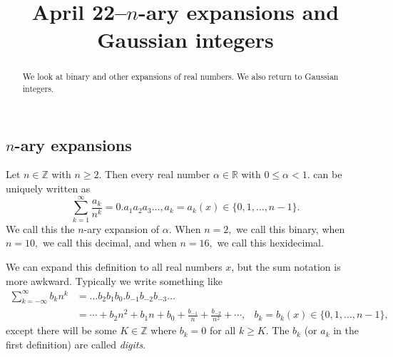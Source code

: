 \documentclass{ximera}
\title{April 22--$n$-ary expansions and Gaussian integers}
\begin{document}
  
\begin{abstract}  We look at binary and other expansions of real numbers. We also return to Gaussian integers.
\end{abstract}  
\maketitle  


\subsection{$n$-ary expansions}
\begin{definition} Let $n\in\mathbb{Z}$ with $n\geq 2$. Then every real number $\alpha\in\mathbb{R}$ with $0\leq\alpha<1$. can be uniquely written as 
\[\displaystyle\sum_{k=1}^\infty \frac{a_k}{n^k}=0.a_1a_2a_3\dots,a_k=a_k(x)\in\{0,1,\dots,n-1\}.\] We call this the $n$-ary expansion of $\alpha$. When $n=2,$ we call this binary, when $n=10,$ we call this decimal, and when $n=16,$ we call this hexidecimal.

We can expand this definition to all real numbers $x$, but the sum notation is more awkward. Typically we write something like
 \begin{align*}
 \displaystyle\sum_{k=-\infty}^\infty {b_k}{n^k}&=\dots b_2b_1b_0.b_{-1}b_{-2}b_{-3}\dots\\
 &=\cdots+b_2 n^2+b_1 n+b_0+\frac{b_{-1}}{n}+\frac{b_{-2}}{n^2}+\cdots, 
& b_k=b_k(x)\in\{0,1,\dots,n-1\},\end{align*} 
 except there will be some $K\in\mathbb{Z}$ where $b_k=0$ for all $k\geq K$. The $b_k$ (or $a_k$ in the first definition) are called \emph{digits}.
\end{definition}
\end{document}
